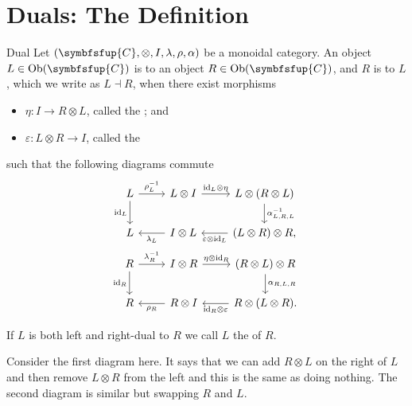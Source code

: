 \documentclass[fleqn]{NotesClass}
\newcommand{\cat}[1]{\symbfsfup{#1}}
\DeclareMathOperator{\Ob}{Ob}
\DeclareMathOperator{\id}{id}
\newcommand{\leftdual}{\dashv}
\begin{document}
    \section{Duals: The Definition}
    \begin{dfn}{Dual}{}
        Let \((\cat{C}, \otimes, I, \lambda, \rho, \alpha)\) be a monoidal category.
        An object \(L \in \Ob(\cat{C})\) is  to an object \(R \in \Ob(\cat{C})\), and \(R\) is  to \(L\), which we write as \(L \leftdual R\), when there exist morphisms
        \begin{itemize}
            \item \(\eta \colon I \to R \otimes L\), called the ; and
            \item \(\varepsilon \colon L \otimes R \to I\), called the 
        \end{itemize}
        such that the following diagrams commute
        \begin{gather}
            \begin{tikzcd}[ampersand replacement=\&]
                L \arrow[r, "\rho_L^{-1}"] \arrow[d, "\id_L"'] \& L \otimes I \arrow[r, "{\id_L} \otimes \eta"] \& L \otimes (R \otimes L) \arrow[d, "\alpha_{L,R,L}^{-1}"]\\
                L \& I \otimes L \arrow[l, "\lambda_L"] \& (L \otimes R) \otimes R, \arrow[l, "\varepsilon \otimes \id_L"]
            \end{tikzcd}
            \\
            \begin{tikzcd}[ampersand replacement=\&]
                R \arrow[r, "\lambda_R^{-1}"] \arrow[d, "\id_R"'] \& I \otimes R \arrow[r, "\eta \otimes \id_R"] \& (R \otimes L) \otimes R \arrow[d, "\alpha_{R,L,R}"]\\
                R \& R \otimes I \arrow[l, "\rho_R"] \& R \otimes (L \otimes R). \arrow[l, "{\id_R} \otimes \varepsilon"]
            \end{tikzcd}
        \end{gather}
                
        If \(L\) is both left and right-dual to \(R\) we call \(L\) the  of \(R\).
    \end{dfn}
    
    Consider the first diagram here.
    It says that we can add \(R \otimes L\) on the right of \(L\) and then remove \(L \otimes R\) from the left and this is the same as doing nothing.
    The second diagram is similar but swapping \(R\) and \(L\).
    
\end{document}
